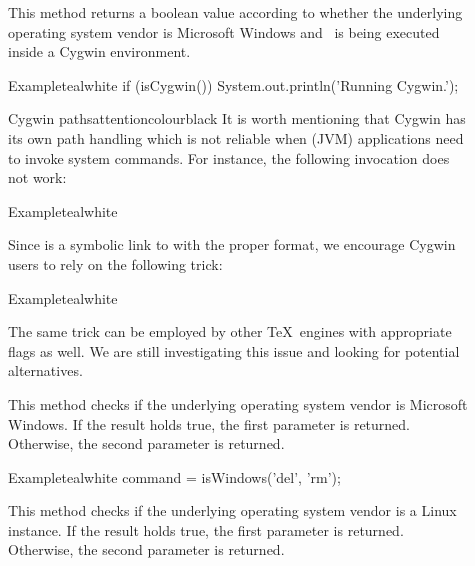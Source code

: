 \begin{description}
\item[] This method returns a boolean value according to whether the underlying operating system vendor is Microsoft Windows and \arara\ is being executed inside a Cygwin environment.

\begin{codebox}{Example}{teal}{\icnote}{white}
if (isCygwin()) { System.out.println('Running Cygwin.'); }
\end{codebox}

\begin{messagebox}{Cygwin paths}{attentioncolour}{\icattention}{black}
It is worth mentioning that Cygwin has its own path handling which is not reliable when (JVM) applications need to invoke system commands. For instance, the following invocation does not work:

\begin{codebox}{Example}{teal}{\icnote}{white}
\end{codebox}

Since  is a symbolic link to  with the proper format, we encourage Cygwin users to rely on the following trick:

\begin{codebox}{Example}{teal}{\icnote}{white}
\end{codebox}

The same trick can be employed by other \TeX\ engines with appropriate  flags as well. We are still investigating this issue and looking for potential alternatives.
\end{messagebox}

\item[] This method checks if the underlying operating system vendor is Microsoft Windows. If the result holds true, the first parameter is returned. Otherwise, the second parameter is returned.

\begin{codebox}{Example}{teal}{\icnote}{white}
command = isWindows('del', 'rm');
\end{codebox}

\item[] This method checks if the underlying operating system vendor is a Linux instance. If the result holds true, the first parameter is returned. Otherwise, the second parameter is returned.


\end{description}
